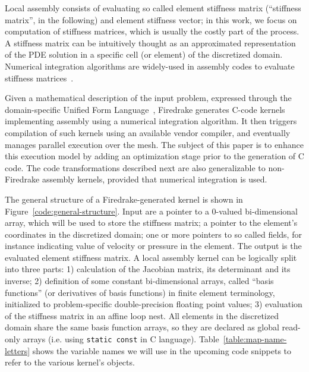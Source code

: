\documentclass[conference]{IEEEtran}
\begin{document}
Local assembly consists of evaluating so called element stiffness matrix (``stiffness matrix'', in the following) and element stiffness vector; in this work, we focus on computation of stiffness matrices, which is usually the costly part of the process. A stiffness matrix can be intuitively thought as an approximated representation of the PDE solution in a specific cell (or element) of the discretized domain. Numerical integration algorithms are widely-used in assembly codes to evaluate stiffness matrices~\cite{quadrature1, fluidity_manual_v4}.

Given a mathematical description of the input problem, expressed through the domain-specific Unified Form Language~\cite{ufl}, Firedrake generates C-code kernels implementing assembly using a numerical integration algorithm. It then triggers compilation of such kernels using an available vendor compiler, and eventually manages parallel execution over the mesh. The subject of this paper is to enhance this execution model by adding an optimization stage prior to the generation of C code. The code transformations described next are also generalizable to non-Firedrake assembly kernels, provided that numerical integration is used.

The general structure of a Firedrake-generated kernel is shown in Figure~\ref{code:general-structure}. Input are a pointer to a 0-valued bi-dimensional array, which will be used to store the stiffness matrix; a pointer to the element's coordinates in the discretized domain; one or more pointers to so called fields, for instance indicating value of velocity or pressure in the element. The output is the evaluated element stiffness matrix. A local assembly kernel can be logically split into three parts: 1) calculation of the Jacobian matrix, its determinant and its inverse; 2) definition of some constant bi-dimensional arrays, called ``basis functions'' (or derivatives of basis functions) in finite element terminology, initialized to problem-specific double-precision floating point values; 3) evaluation of the stiffness matrix in an affine loop nest. All elements in the discretized domain share the same basis function arrays, so they are declared as global read-only arrays (i.e. using \texttt{static const} in C language). Table~\ref{table:map-name-letters} shows the variable names we will use in the upcoming code snippets to refer to the various kernel's objects.
\end{document}
